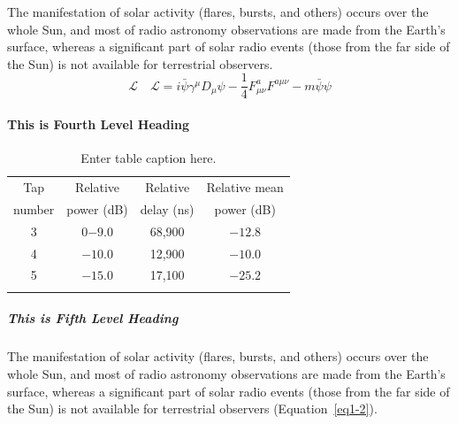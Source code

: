 The manifestation of solar activity (flares, bursts, and others) occurs over the whole Sun, and most of radio astronomy observations are made from the Earth's surface, whereas a significant part of solar radio events (those from the far side of the Sun) is not available for terrestrial observers.
\begin{equation}
     \mathcal{L}\quad \mathbf{\mathcal{L}} = i \bar{\psi} \gamma^\mu D_\mu \psi - 
     \frac{1}{4} F_{\mu\nu}^a F^{a\mu\nu} - m \bar{\psi} \psi\label{eq1-2}
\end{equation}

\paragraph{This is Fourth Level Heading}

\lipsum[5]

\begin{table}
     \caption{Enter table caption here.\label{tab1-1}}{%
          \begin{tabular}{@{}cccc@{}}
               \toprule
               Tap    & Relative   & Relative               & Relative mean \\
               number & power (dB) & delay (ns)             & power (dB)    \\
               \midrule
               3      & 0$-9.0$    & 68,900\footnotemark[1] & $-12.8$       \\
               4      & $-10.0$    & 12,900\footnotemark[2] & $-10.0$       \\
               5      & $-15.0$    & 17,100                 & $-25.2$       \\
               \botrule
          \end{tabular}}{
          }
\end{table}

\subparagraph{This is Fifth Level Heading}

\lipsum[6]

The manifestation of solar activity (flares, bursts, and others) occurs over the whole Sun, and most of radio astronomy observations are made from the Earth's surface, whereas a significant part of solar radio events (those from the far side of the Sun) is not available for terrestrial observers (Equation~\ref{eq1-2}).

